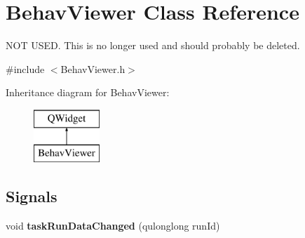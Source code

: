 \hypertarget{class_behav_viewer}{\section{Behav\-Viewer Class Reference}
\label{class_behav_viewer}
}


N\-O\-T U\-S\-E\-D. This is no longer used and should probably be deleted.  




{\ttfamily \#include $<$Behav\-Viewer.\-h$>$}

Inheritance diagram for Behav\-Viewer\-:\begin{figure}[H]
\begin{center}
\leavevmode
\includegraphics[height=2.000000cm]{class_behav_viewer}
\end{center}
\end{figure}
\subsection*{Signals}
\begin{DoxyCompactItemize}
\item 
\hypertarget{class_behav_viewer_a289f573ddc8f336d0ea4eb0cf0c2c651}{void {\bfseries task\-Run\-Data\-Changed} (qulonglong run\-Id)}\label{class_behav_viewer_a289f573ddc8f336d0ea4eb0cf0c2c651}

\end{DoxyCompactItemize}
